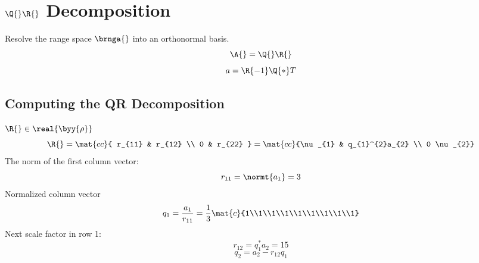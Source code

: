 \break
\clearpage
\section{$\Q{}\R{}$ Decomposition}  %
Resolve the range space $\brnga{}$ into an orthonormal basis.
  \begin{equation*}   %
    \A{} = \Q{} \R{}
  \end{equation*}
  \begin{equation*}   %
    a = \R{-1}\Q{*}T
  \end{equation*}
  
\subsection{Computing the QR Decomposition}  %
$\R{}\in\real{\byy{\rho}}$
  \begin{equation*}   %
    \R{} = \mat{cc}{ r_{11} & r_{12} \\ 0 & r_{22} } = \mat{cc}{\nu_{1} & q_{1}^{2}a_{2} \\ 0 \nu_{2}}
  \end{equation*}
The norm of the first column vector:
  \begin{equation}
        r_{11} = \normt{a_{1}} = 3
  \end{equation}
Normalized column vector
  \begin{equation}
        q_{1} = \frac{a_{1}} {r_{11}} = \frac{1}{3}\mat{c}{1\\1\\1\\1\\1\\1\\1\\1\\1}
  \end{equation}
Next scale factor in row 1:
  \begin{equation}
        r_{12} = q_{1}^{*}a_{2} = 15
  \end{equation}
  \begin{equation}
        q_{2} = a_{2} - r_{12} q_{1}
  \end{equation}
